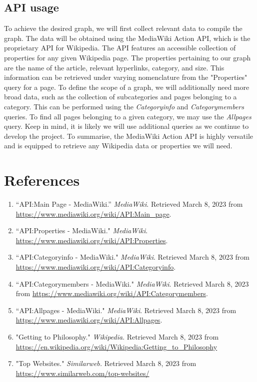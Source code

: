 \documentclass[fontsize=11pt]{article}
\begin{document}
\subsection*{API usage}
To achieve the desired graph, we will first collect relevant data to compile the graph. The data will be obtained using the MediaWiki Action API, which is the proprietary API for Wikipedia. The API features an accessible collection of properties for any given Wikipedia page. The properties pertaining to our graph are the name of the article, relevant hyperlinks, category, and size. This information can be retrieved under varying nomenclature from the "Properties" query for a page. To define the scope of a graph, we will additionally need more broad data, such as the collection of subcategories and pages belonging to a category. This can be performed using the \textit{Categoryinfo} and \textit{Categorymembers} queries. To find all pages belonging to a given category, we may use the \textit{Allpages} query. Keep in mind, it is likely we will use additional queries as we continue to develop the project. To summarise, the MediaWiki Action API is highly versatile and is equipped to retrieve any Wikipedia data or properties we will need.

\section*{References}
\begin{enumerate}
    \item “API:Main Page - MediaWiki.” \textit{MediaWiki}. Retrieved March 8, 2023 from 
    \url{https://www.mediawiki.org/wiki/API:Main\_page}.
    \item “API:Properties - MediaWiki." \textit{MediaWiki}. \url{https://www.mediawiki.org/wiki/API:Properties}.
    \item “API:Categoryinfo - MediaWiki." \textit{MediaWiki}. Retrieved March 8, 2023 from
    \url{https://www.mediawiki.org/wiki/API:Categoryinfo}.
    \item “API:Categorymembers - MediaWiki." \textit{MediaWiki}. Retrieved March 8, 2023 from
    \url{https://www.mediawiki.org/wiki/API:Categorymembers}.
    \item “API:Allpages - MediaWiki." \textit{MediaWiki}. Retrieved March 8, 2023 from 
    \url{https://www.mediawiki.org/wiki/API:Allpages}.
    \item "Getting to Philosophy." \textit{Wikipedia}. Retrieved March 8, 2023 from 
    \url{https://en.wikipedia.org/wiki/Wikipedia:Getting_to_Philosophy}
    \item "Top Websites." \textit{Similarweb.} Retrieved March 8, 2023 from 	\url{https://www.similarweb.com/top-websites/}
    
\end{enumerate}

\end{document}
